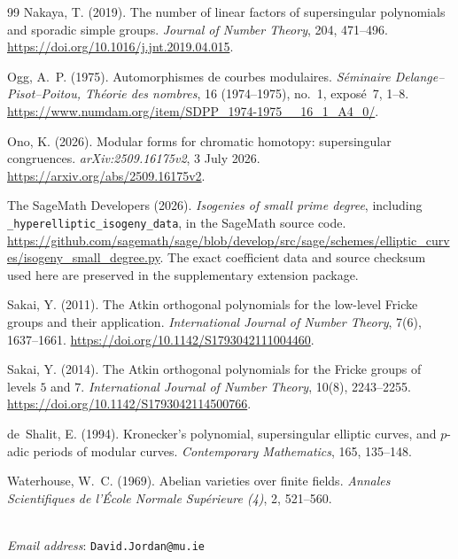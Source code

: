 \documentclass[11pt,a4paper]{article}
\numberwithin{equation}{section}
\theoremstyle{definition}
\theoremstyle{remark}
\begin{document}
\begin{thebibliography}{99}
 Nakaya, T. (2019). The number of linear factors of
supersingular polynomials and sporadic simple groups. \emph{Journal of Number Theory},
204, 471--496. \url{https://doi.org/10.1016/j.jnt.2019.04.015}.


 Ogg, A.~P. (1975).
Automorphismes de courbes modulaires.
\emph{S\'eminaire Delange--Pisot--Poitou, Th\'eorie des nombres},
16 (1974--1975), no.~1, expos\'e~7, 1--8.
\url{https://www.numdam.org/item/SDPP_1974-1975__16_1_A4_0/}.


 Ono, K. (2026). Modular forms for chromatic homotopy: supersingular congruences. \emph{arXiv:2509.16175v2}, 3 July 2026. \url{https://arxiv.org/abs/2509.16175v2}.


 The SageMath Developers (2026).
\emph{Isogenies of small prime degree}, including
\texttt{\_hyperelliptic\_isogeny\_data}, in the SageMath source code.
\url{https://github.com/sagemath/sage/blob/develop/src/sage/schemes/elliptic_curves/isogeny_small_degree.py}.
The exact coefficient data and source checksum used here are preserved
in the supplementary extension package.


 Sakai, Y. (2011). The Atkin orthogonal polynomials for
the low-level Fricke groups and their application.
\emph{International Journal of Number Theory}, 7(6), 1637--1661.
\url{https://doi.org/10.1142/S1793042111004460}.


 Sakai, Y. (2014). The Atkin orthogonal polynomials for
the Fricke groups of levels $5$ and $7$.
\emph{International Journal of Number Theory}, 10(8), 2243--2255.
\url{https://doi.org/10.1142/S1793042114500766}.


 de~Shalit, E. (1994). Kronecker's polynomial, supersingular elliptic curves,
and $p$-adic periods of modular curves. \emph{Contemporary Mathematics}, 165, 135--148.


 Waterhouse, W.~C. (1969). Abelian varieties over finite fields. \emph{Annales Scientifiques de l'\'Ecole Normale Sup\'erieure (4)}, 2, 521--560.
\end{thebibliography}
	\bigskip
{}\\
\emph{Email address}: \texttt{David.Jordan@mu.ie}
\end{document}
